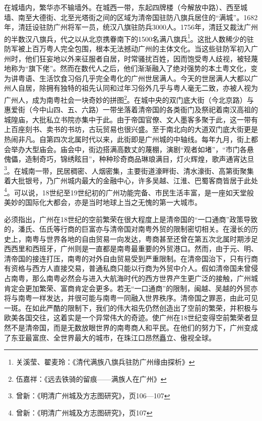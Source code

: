 在城墙内，繁华亦不输墙外。在城西一带，东起四牌楼（今解放中路）、西至城墙、南至大德街、北至光塔街之间的区域为清帝国驻防八旗兵居住的“满城”。1682年，清廷设驻防广州将军一员，统汉八旗驻防兵3000人。1756年，清廷又裁汰广州的半数汉八旗兵，代之以从北京携眷南下的1500名满八旗兵\footnote{关溪莹、翟麦玲：《清代满族八旗兵驻防广州缘由探析》}。这批人数稀少的驻防军被上百万粤人完全包围，根本无法撼动广州的主体文化。当这些驻防军初入广州时，他们狂妄地以外来征服者自居，时常骚扰百姓，因而饱受粤人歧视，被轻蔑地称为“旗下佬”。然而在数代人之后，他们渐渐融入了绝对强势的本土粤文化，变为讲粤语、生活饮食习俗几乎完全粤化的广州世居满人。今天的世居满人大都以广州人自居，除拥有独特的祖先认同和过年习俗外几乎与粤人毫无二致，亦被人视为广州人，成为南粤社会一块奇妙的拼图\footnote{伍嘉祥：《远去铁骑的留痕——满族人在广州》}。在城中央的双门底大街（今北京路）与惠爱街（今中山四、五、六路）一带坐落着清帝国的各类衙门及祭祀着南汉高祖的城隍庙，大批私立书院亦集中于此。由于帝国官僚、文人墨客多聚于此，这一带有上百座刻书、卖书的书坊，古玩贸易也很兴盛。至于南北向的大道双门底大街更是热闹非凡。自第四次北属时代以来，此街即是广州城的中轴线。每年九月，街上都会举办大型庙会。庙会中，街边搭满高数丈的蔑棚，演剧“观者如堵”，“市门各悬傀儡，造制奇巧，锦绣眩目”，种种珍奇商品琳琅满目，灯火辉煌，歌声通宵达旦\footnote{曾新：《明清广州城及方志图研究》，页106—107}。在城南一带，民居稠密、人烟密集，主要街道濠畔街、清水濠街、高第街聚集着大批银号，乃广州城内最大的金融中心，许多吴越、江淮、巴蜀客商皆居于此处\footnote{曾新：《明清广州城及方志图研究》，页107}。可以说，18世纪至19世纪初的广州功能完备、市民生活丰富，是一座如天堂般美妙的国际化大都会，亦是当时地球上当之无愧的第一大城市。

必须指出，广州在18世纪的空前繁荣在很大程度上是清帝国的“一口通商”政策导致的，潘氏、伍氏等行商的巨富亦与清帝国对南粤外贸的限制密切相关。在漫长的历史上，南粤与世界各地的自由贸易一向发达，粤商甚至还曾在第五次北属时期涉足西西里和西班牙，广州则是一直都是南粤最重要的外贸港口。然而，由于元、明、清帝国的接连打压，南粤的对外自由贸易受到严重限制。在清帝国治下，只有行商有资格与西方人直接交易，普通私商只能以行商为外贸中介人。假如清帝国未曾侵占南粤，那么南粤必然会与进入大航海时代的西方世界产生更广泛的接触，广州城肯定会更加繁荣、富商肯定会更多。若无“一口通商”的限制，闽越、吴越的外贸亦将与南粤一样发达，并很可能与南粤一同融入世界秩序。清帝国之罪恶，由此可见一斑。在如此严酷的限制下，我们的伟大祖先仍然创造出了空前的繁荣，并积极与欧美各国交往，这着实是一个异常伟大的奇迹。使广州在18世纪变得空前繁荣者显然不是清帝国，而是无数放眼世界的南粤商人和平民。在他们的努力下，广州变成了东亚最富庶、全世界最大的城市，在珠江口昂然矗立、傲视全球。


